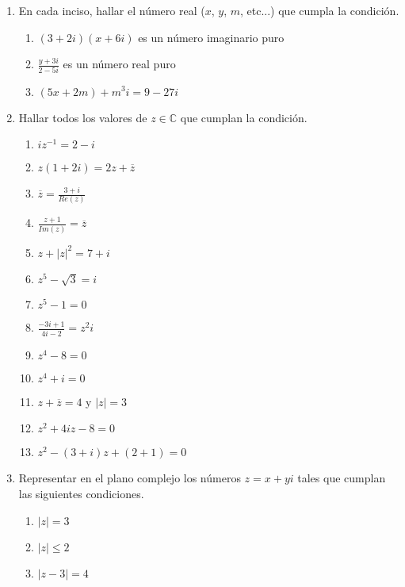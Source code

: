 \documentclass[a4paper]{article}
\newcommand{\exercise}{\item}
\newcommand{\df}[2]{\displaystyle\frac{#1}{#2}}
\newcommand{\conj}[1]{\overline{#1}}
\begin{document}
\begin{enumerate}
\begin{multicols}{2}
\begin{enumerate} [label=(\alph*)]
		\item $|z.(1+2i)|^2=(|z|.|3+4i|)^2$
		\item $z+\conj{z} \in \mathbb{R}$
		\item $z-\conj{z} \not\in \mathbb{R}$
		\item $|z-w|=d(z,w)$
	\end{enumerate}
	\end{multicols}
	\exercise En cada inciso, hallar el número real ($x$, $y$, $m$, etc...) que cumpla la condición.
	\begin{enumerate} [label=(\alph*)]
		\item $(3+2i)(x+6i)$ es un número imaginario puro
		\item $\df{y+3i}{2-5i}$ es un número real puro
		\item $(5x+2m)+m^3i = 9-27i$
	\end{enumerate}
	\exercise Hallar todos los valores de $z \in \mathbb{C}$ que cumplan la condición.
	\begin{multicols}{2}
	\begin{enumerate} [label=(\alph*)]
		\item $iz^{-1}=2-i$
		\item $z(1+2i)=2z+\conj{z}$
		\item $\conj{z}=\df{3+i}{Re(z)}$
		\item $\df{z+1}{Im(z)}=\conj{z}$
		\item $z+|z|^2=7+i$
		\item $z^5-\sqrt{3}=i$
		\item $z^5-1=0$
		\item $\df{-3i+1}{4i-2}=z^2i$
		\item $z^4-8=0$
		\item $z^4+i=0$
		\item $z+\conj{z}=4$ y $|z|=3$
		\item $z^2+4iz-8=0$
		\item $z^2-(3+i)z+(2+1)=0$
	\end{enumerate}
	\end{multicols}
	\exercise Representar en el plano complejo los números $z=x+yi$ tales que cumplan las siguientes condiciones.
	\begin{multicols}{2}
	\begin{enumerate} [label=(\alph*)]
		\item $|z|=3$
		\item $|z|\leq 2$
		\item $|z-3| = 4$

\end{enumerate}
\end{multicols}
\end{enumerate}
\end{document}

